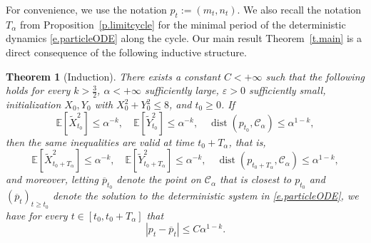 \documentclass[11pt]{amsart}
\newtheorem{theorem}[proposition]{Theorem}
\theoremstyle{remark}
\theoremstyle{definition}
\numberwithin{equation}{section}
\numberwithin{proposition}{section}
\newcommand{\eps}{\varepsilon}
\renewcommand{\le}{\leqslant}
\renewcommand{\ge}{\geqslant}
\renewcommand{\bar}{\overline}
\newcommand{\td}{\widetilde}
\newcommand{\1}{\mathbf{1}}
\newcommand{\msc}{\mathscr}
\newcommand{\al}{\alpha}
\DeclareMathOperator{\dist}{dist}
\newcommand{\E}{\mathbb E}
\begin{document}
For convenience, we use the notation $p_t := (m_t, n_t)$. We also recall the notation $T_\al$ from Proposition~\ref{p.limitcycle} for the minimal period of the deterministic dynamics \eqref{e.particleODE} along the cycle. Our main result Theorem~\ref{t.main} is a direct consequence of the following inductive structure.
\begin{theorem}[Induction]
\label{t.bootstrap}
There exists a constant $C < +\infty$ such that the following holds for every $k  > \frac 3 2$, $\alpha < +\infty$ sufficiently large, $\eps > 0$ sufficiently small, initialization $X_0, Y_0$ with $X_0^2 + Y_0^2 \le 8$, and $t_0 \ge 0$. If
\begin{equation}  
\label{e.bootstrap.ass}
\E[\td X_{t_0}^2]\le \al^{-k}, \quad \E[\td Y_{t_0}^2]\le \al^{-k}, \quad \dist(p_{t_0}, \msc C_\al) \le  \alpha^{1 - k},
\end{equation}
then the same inequalities are valid at time $t_0 + T_\al$, that is,
\begin{equation}  
\label{e.bootstrap.ccl}
\E[\td X_{t_0+T_\al}^2]\le \al^{-k}, \quad \E[\td Y_{t_0+T_\al}^2]\le \al^{-k}, \quad \dist(p_{t_0+T_\al}, \msc C_\al) \le \alpha^{1 - k},
\end{equation}
and moreover, letting $\bar p_{t_0}$ denote the point on $\msc C_\al$ that is closest to $p_{t_0}$ and $(\bar p_t)_{t \ge t_0}$ denote the solution to the deterministic system in \eqref{e.particleODE}, we have for every $t \in [t_0,t_0+T_\al]$ that
\begin{equation}  
\label{e.bootstrap.cycle}
|p_t - \bar p_t| \le C \al^{1 -k}.
\end{equation}
\end{theorem}
\end{document}
